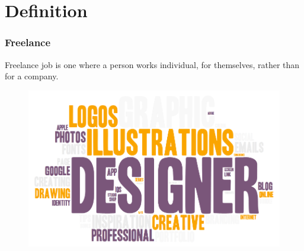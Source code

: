 \section[Definition]{Definition}
\begin{frame}
	\frametitle{Freelance}
			Freelance job is one where a person works individual, for themselves, rather than for a company. 
        \begin{figure}
            \includegraphics[scale=0.2]{figures/Freelance-Creatives.png}
		\end{figure}
\end{frame}
\begin{frame}
\end{frame}